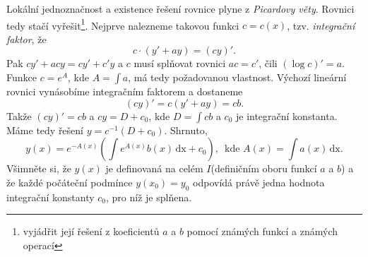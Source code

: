 \documentclass[../main.tex]{subfiles}
\begin{document}
\begin{remark}
    Lokální jednoznačnost a existence řešení rovnice plyne z \textit{Picardovy věty}.
    Rovnici tedy stačí vyřešit\footnote{vyjádřit její řešení z koeficientů $a$ a $b$ pomocí známých funkcí a známých operací}.
    Nejprve nalezneme takovou funkci $c = c(x)$, tzv. \textit{integrační faktor}, že
    \[ c\cdot(y' + ay) = (cy)'. \]
    Pak $cy' + acy = cy' + c'y$ a $c$ musí splňovat rovnici $ac = c'$, čili $(\log c)' = a$. Funkce
    $c=e^A$, kde $A = \int a$, má tedy požadovanou vlastnost. Výchozí lineární rovnici vynásobíme integračním faktorem a dostaneme
    \[ (cy)' = c(y'+ay) = cb. \]
    Takže $(cy)' = cb$ a $cy = D + c_0$, kde $D = \int cb$ a $c_0$ je integrační konstanta. Máme tedy
    řešení $y = c^{-1}(D+c_0)$. Shrnuto,
    \[ y(x) = e^{-A(x)} \left( \int e^{A(x)}b(x)\,\text{dx} + c_0 \right), \,\,\, \text{kde} \,\, A(x) = \int a(x)\,\text{dx}. \]
    Všimněte si, že $y(x)$ je definovaná na celém $I$(definičním oboru funkcí $a$ a $b$) a že každé počáteční podmínce $y(x_0) = y_0$
    odpovídá právě jedna hodnota integrační konstanty $c_0$, pro níž je splňena.
\end{remark}
\end{document}
